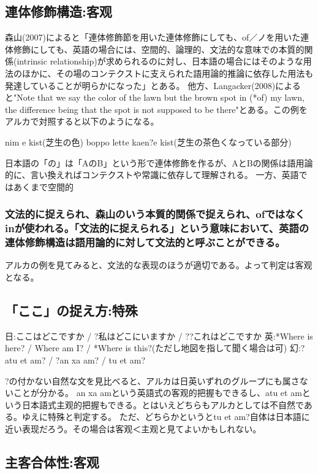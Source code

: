 \subsection{連体修飾構造:客观}

森山(2007)によると「連体修飾節を用いた連体修飾にしても、of／ノを用いた連体修飾にしても、英語の場合には、空間的、論理的、文法的な意味での本質的関係(intrinsic relationship)が求められるのに対し、日本語の場合にはそのような用法のほかに、その場のコンテクストに支えられた語用論的推論に依存した用法も発達していることが明らかになった」とある。
他方、Langacker(2008)によると"Note that we say the color of the lawn but the brown spot in (*of) my lawn, the difference being that the spot is not supposed to be there"とある。この例をアルカで対照すると以下のようになる。

nim e kist(芝生の色)
boppo lette kaen{?e} kist(芝生の茶色くなっている部分)

日本語の「の」は「AのB」という形で連体修飾を作るが、AとBの関係は語用論的に、言い換えればコンテクストや常識に依存して理解される。
一方、英語ではあくまで空間的\subsubsection{文法的に捉えられ、森山のいう本質的関係で捉えられ、ofではなくinが使われる。「文法的に捉えられる」という意味において、英語の連体修飾構造は語用論的に対して文法的と呼ぶことができる。}
アルカの例を見てみると、文法的な表现のほうが適切である。よって判定は客观となる。

\subsection{「ここ」の捉え方:特殊}

日:ここはどこですか / ?私はどこにいますか / ??これはどこですか
英:*Where is here? / Where am I? / *Where is this?(ただし地図を指して聞く場合は可)
幻:?atu et am? / ?an xa am? / tu et am?

?の付かない自然な文を見比べると、アルカは日英いずれのグループにも属さないことが分かる。
an xa amという英語式の客观的把握もできるし、atu et amという日本語式主观的把握もできる。とはいえどちらもアルカとしては不自然である。ゆえに特殊と判定する。
ただ、どちらかというとtu et am?自体は日本語に近い表现だろう。その場合は客观＜主观と見てよいかもしれない。

\subsection{主客合体性:客观}

